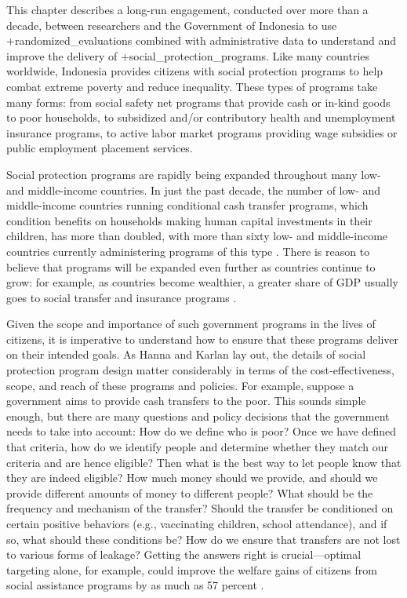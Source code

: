 \documentclass[
]{book}
\begin{document}
This chapter describes a long-run engagement, conducted over more than a decade, between researchers and the Government of Indonesia to use +randomized\_evaluations\textbar{} combined with administrative data to understand and improve the delivery of +social\_protection\_programs\textbar. Like many countries worldwide, Indonesia provides citizens with social protection programs to help combat extreme poverty and reduce inequality. These types of programs take many forms: from social safety net programs that provide cash or in-kind goods to poor households, to subsidized and/or contributory health and unemployment insurance programs, to active labor market programs providing wage subsidies or public employment placement services.

Social protection programs are rapidly being expanded throughout many low- and middle-income countries. In just the past decade, the number of low- and middle-income countries running conditional cash transfer programs, which condition benefits on households making human capital investments in their children, has more than doubled, with more than sixty low- and middle-income countries currently administering programs of this type \citep{worldbank2018}. There is reason to believe that programs will be expanded even further as countries continue to grow: for example, as countries become wealthier, a greater share of GDP usually goes to social transfer and insurance programs \citep{chetty2006}.

Given the scope and importance of such government programs in the lives of citizens, it is imperative to understand how to ensure that these programs deliver on their intended goals. As Hanna and Karlan \citeyearpar{hanna2017} lay out, the details of social protection program design matter considerably in terms of the cost-effectiveness, scope, and reach of these programs and policies. For example, suppose a government aims to provide cash transfers to the poor. This sounds simple enough, but there are many questions and policy decisions that the government needs to take into account: How do we define who is poor? Once we have defined that criteria, how do we identify people and determine whether they match our criteria and are hence eligible? Then what is the best way to let people know that they are indeed eligible? How much money should we provide, and should we provide different amounts of money to different people? What should be the frequency and mechanism of the transfer? Should the transfer be conditioned on certain positive behaviors (e.g., vaccinating children, school attendance), and if so, what should these conditions be? How do we ensure that transfers are not lost to various forms of leakage? Getting the answers right is crucial---optimal targeting alone, for example, could improve the welfare gains of citizens from social assistance programs by as much as 57 percent \citep{alatas2019}.
\end{document}
